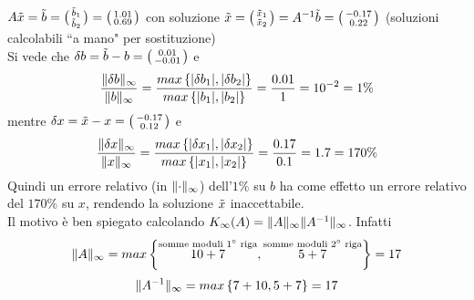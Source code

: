 \documentclass[12pt,a4paper]{article}
\DeclarePairedDelimiter{\norma}{\lVert}{\rVert}
\begin{document}
 $A\tilde{x}=\tilde{b}=\bigl(\begin{smallmatrix}
    \Tilde{b}_1 \\
    \Tilde{b}_2
\end{smallmatrix}\bigr)=\bigl(\begin{smallmatrix}
    1.01 \\
    0.69
\end{smallmatrix}\bigr)$ con soluzione $\Tilde{x}=\bigl(\begin{smallmatrix}
    \Tilde{x}_1 \\
    \Tilde{x}_2
\end{smallmatrix}\bigr) =A^{-1}\Tilde{b}=\bigl(\begin{smallmatrix}
    -0.17 \\
    0.22
\end{smallmatrix}\bigr)$ (soluzioni calcolabili ``a mano" per sostituzione)\\
Si vede che $\delta b=\Tilde{b}-b = \bigl(\begin{smallmatrix}
    0.01 \\
    -0.01
\end{smallmatrix}\bigr)$ e 
\begin{equation*}
    \frac{\norma{\delta b}_\infty}{\norma{b}_\infty} = \frac{max\left\{ |\delta b_1|,|\delta b_2| \right\}}{max\left\{ |b_1|,|b_2| \right\}} = \frac{0.01}{1} = 10^{-2} = 1\%
\end{equation*} mentre $\delta x = \Tilde{x}-x=\bigl(\begin{smallmatrix}
    -0.17 \\
    0.12
\end{smallmatrix}\bigr)$ e 
\begin{equation*}
    \frac{\norma{\delta x}_\infty}{\norma{x}_\infty} = \frac{max\left\{ |\delta x_1|,|\delta x_2| \right\}}{max\left\{ |x_1|,|x_2| \right\}} = \frac{0.17}{0.1} = 1.7 = 170\%
\end{equation*}
Quindi un errore relativo (in $\norma{\cdot}_\infty$) dell'$1\%$ su $b$ ha come effetto un errore relativo del $170\%$ su $x$, rendendo la soluzione $\Tilde{x}$ inaccettabile. \\
Il motivo è ben spiegato calcolando $K_\infty(A)=\norma{A}_\infty \norma{A^{-1}}_\infty$. Infatti
\begin{equation*}
    \norma{A}_\infty = max \left\{ \overset{\text{somme moduli 1$^\circ$ riga}}{10+7}, \overset{\text{somme moduli 2$^\circ$ riga}}{5+7} \right\} = 17
\end{equation*}
\begin{equation*}
    \norma{A^{-1}}_\infty = max \left\{ 7+10, 5+7 \right\} = 17
\end{equation*}
\end{document}
